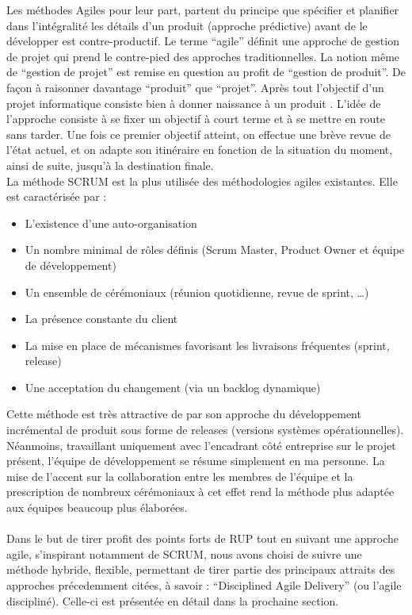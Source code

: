 \begin{spacing}{1.5}
Les méthodes Agiles pour leur part, partent du principe que spécifier et planifier dans l’intégralité les détails d’un produit (approche prédictive) avant de le développer est contre-productif. Le terme “agile” définit une approche de gestion de projet qui prend le contre-pied des approches traditionnelles. La notion même de “gestion de projet” est remise en question au profit de “gestion de produit”. De façon à raisonner davantage “produit” que “projet”. Après tout l'objectif d'un projet informatique consiste bien à donner naissance à un produit \cite{http://www.agiliste.fr/introduction-methodes-agiles/}.  L’idée de l’approche consiste à se fixer un objectif à court terme et à se mettre en route sans tarder. Une fois ce premier objectif atteint, on effectue une brève revue de l'état actuel, et on adapte son itinéraire en fonction de la situation du moment, ainsi de suite, jusqu’à la destination finale.\\
La méthode SCRUM est la plus utilisée des méthodologies agiles existantes. Elle est caractérisée par :
\begin{itemize}
    \item L’existence d’une auto-organisation
    \item Un nombre minimal de rôles définis (Scrum Master, Product Owner et équipe de développement)
    \item Un ensemble de cérémoniaux (réunion quotidienne, revue de sprint, …)
    \item La présence constante du client
    \item La mise en place de mécanismes favorisant les livraisons fréquentes (sprint, release)
    \item Une acceptation du changement (via un backlog dynamique)
\end{itemize}
Cette méthode est très attractive de par son approche du développement incrémental de produit sous forme de releases (versions systèmes opérationnelles). Néanmoins, travaillant uniquement avec l'encadrant côté entreprise sur le projet présent, l'équipe de développement se résume simplement en ma personne. La mise de l'accent sur la collaboration entre les membres de l'équipe et la prescription de nombreux cérémoniaux à cet effet rend la méthode plus adaptée aux équipes beaucoup plus élaborées.\\
\\
Dans le but de tirer profit des points forts de RUP tout en suivant une approche agile, s'inspirant notamment de SCRUM, nous avons choisi de suivre une méthode hybride, flexible, permettant de tirer partie des principaux attraits des approches précedemment citées, à savoir : “Disciplined Agile Delivery” (ou l'agile discipliné). Celle-ci est présentée en détail dans la prochaine section.


\end{spacing}
